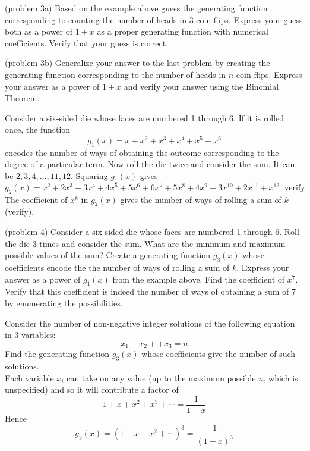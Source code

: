 \documentclass[handout]{ximera}
\begin{document}
\begin{problem}(problem 3a)
Based on the example above guess the generating function corresponding to counting the number of heads in 3 coin flips.
Express your guess both as a power of $1+x$ as a proper generating function with numerical coefficients.
Verify that your guess is correct. 
\end{problem}

\begin{problem}(problem 3b)
Generalize your answer to the last problem by creating the generating function corresponding to the 
number of heads in $n$ coin flips.
Express your answer as a power of $1+x$ and verify your answer using the Binomial Theorem.
\end{problem}
 

\begin{example}[example 4]
Consider a six-sided die whose faces are numbered 1 through 6. If it is rolled once, the function
\[
g_1(x) = x + x^2 + x^3 + x^4 + x^5 + x^6
\]
encodes the number of ways of obtaining the outcome corresponding to the degree of a particular term.
Now roll the die twice and consider the sum. It can be $2, 3, 4, ..., 11, 12$. Squaring $g_1(x)$ gives
\[
g_2(x) = x^2 + 2x^3 + 3x^4 + 4x^5 + 5x^6 + 6x^7 + 5x^8 + 4x^9+ 3x^{10} + 2x^{11} + x^{12} \;\; \text{verify}
\]
The coefficient of $x^k$ in $g_2(x)$ gives the number of ways of rolling a sum of $k$ (verify).
\end{example}

\begin{problem}(problem 4)
Consider a six-sided die whose faces are numbered 1 through 6. Roll the die 3 times and consider the sum.
What are the minimum and maximum possible values of the sum? Create a generating function $g_3(x)$ whose coefficients 
encode the the number of ways of rolling a sum of $k$.  Express your answer as a power of $g_1(x)$ from the example above.
Find the coefficient of $x^7$. Verify that this coefficient is 
indeed the number of ways of obtaining a sum of $7$ by enumerating the possibilities.
\end{problem}


\begin{example}[example 5]
Consider the number of non-negative integer solutions of the following equation in $3$ variables:
\[
x_1 + x_2 +  + x_3 = n
\]
Find the generating function $g_3(x)$ whose coefficients give the number of such solutions.\\
Each variable $x_i$ can take on any value (up to the maximum possible $n$, which is unspecified) and so it will contribute 
a factor of 
\[
1 + x + x^2 +x^3 + \cdots = \frac{1}{1-x}
\]
Hence
\[
g_3(x) = (1+x+x^2 + \cdots)^3 = \frac{1}{(1-x)^3}
\]
\end{example}
\end{document}
